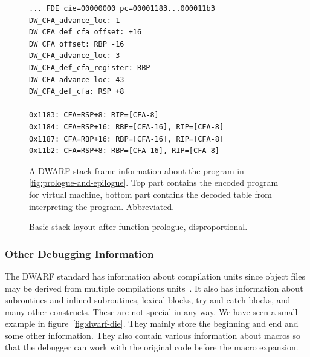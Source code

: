 \begin{figure}
    \begin{lstlisting}
... FDE cie=00000000 pc=00001183...000011b3
DW_CFA_advance_loc: 1
DW_CFA_def_cfa_offset: +16
DW_CFA_offset: RBP -16
DW_CFA_advance_loc: 3
DW_CFA_def_cfa_register: RBP
DW_CFA_advance_loc: 43
DW_CFA_def_cfa: RSP +8

0x1183: CFA=RSP+8: RIP=[CFA-8]
0x1184: CFA=RSP+16: RBP=[CFA-16], RIP=[CFA-8]
0x1187: CFA=RBP+16: RBP=[CFA-16], RIP=[CFA-8]
0x11b2: CFA=RSP+8: RBP=[CFA-16], RIP=[CFA-8]
    \end{lstlisting}
    \caption{A DWARF stack frame information about the program in
             \ref{fig:prologue-and-epilogue}. Top part contains the encoded
             program for virtual machine, bottom part contains the decoded
             table from interpreting the program. Abbreviated.}
    \label{fig:dwarf-stack-frames}
\end{figure}

\begin{figure}
    \centering
    \caption{Basic stack layout after function prologue, disproportional.}
    \label{fig:stack-layout}
\end{figure}

\subsubsection{Other Debugging Information}
The DWARF standard has information about compilation units since object files
may be derived from multiple compilations units~\cite{dwarf}. It also has
information about subroutines and inlined subroutines, lexical blocks,
try-and-catch blocks, and many other constructs. These are not special in any
way. We have seen a small example in figure~\ref{fig:dwarf-die}. They mainly
store the beginning and end and some other information. They also contain
various information about macros so that the debugger can work with the
original code before the macro expansion.


